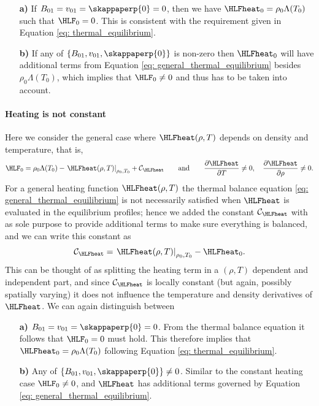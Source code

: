 \begin{enumerate}
  \item[\textbf{a)}] If $B_{01} = v_{01} = \skappaperp{0} = 0$, then we have $\HLFheat_0 = \rho_0\Lambda(T_0)$ such that $\HLF_0 = 0$. This is consistent with the requirement given in Equation \eqref{eq: thermal_equilibrium}.
  \item[\textbf{b)}] If any of $\{B_{01}, v_{01}, \skappaperp{0}\}$ is non-zero then $\HLFheat_0$ will have additional terms from Equation \eqref{eq: general_thermal_equilibrium} besides $\rho_0\Lambda(T_0)$, which implies that $\HLF_0 \neq 0$ and thus has to be taken into account.
\end{enumerate}

\paragraph{Heating is not constant}
Here we consider the general case where $\HLFheat(\rho, T)$ depends on density and temperature, that is,
\begin{equation}
  \HLF_0 = \rho_0\Lambda(T_0) - \left. \HLFheat(\rho, T)\right|_{\rho_0, T_0} + \mathcal{C}_\HLFheat
  \qquad
  \text{and}
  \qquad
  \frac{\partial \HLFheat}{\partial T} \neq 0,
  \quad
  \frac{\partial \HLFheat}{\partial \rho} \neq 0.
\end{equation}
For a general heating function $\HLFheat(\rho, T)$ the thermal balance equation \eqref{eq: general_thermal_equilibrium} is not necessarily satisfied when $\HLFheat$ is evaluated in the equilibrium profiles; hence we added the constant $\mathcal{C}_\HLFheat$ with as sole purpose to provide additional terms to make sure everything is balanced, and we can write this constant as
\begin{equation}
  \mathcal{C}_\HLFheat = \left.\HLFheat(\rho, T)\right|_{\rho_0, T_0} - \HLFheat_0.
\end{equation}
This can be thought of as splitting the heating term in a $(\rho ,T)$ dependent and independent part, and since $\mathcal{C}_\HLFheat$ is locally constant (but again, possibly spatially varying) it does not influence the temperature and density derivatives of $\HLFheat$. We can again distinguish between

\begin{enumerate}
  \item[\textbf{a)}] $B_{01} = v_{01} = \skappaperp{0} = 0$. From the thermal balance equation it follows that $\HLF_0 = 0$ must hold. This therefore implies that $\HLFheat_0 = \rho_0 \Lambda(T_0)$ following Equation \eqref{eq: thermal_equilibrium}.
  \item[\textbf{b)}] Any of $\{B_{01}, v_{01}, \skappaperp{0}\} \neq 0$. Similar to the constant heating case $\HLF_0 \neq 0$, and $\HLFheat$ has additional terms governed by Equation \eqref{eq: general_thermal_equilibrium}.
\end{enumerate}

